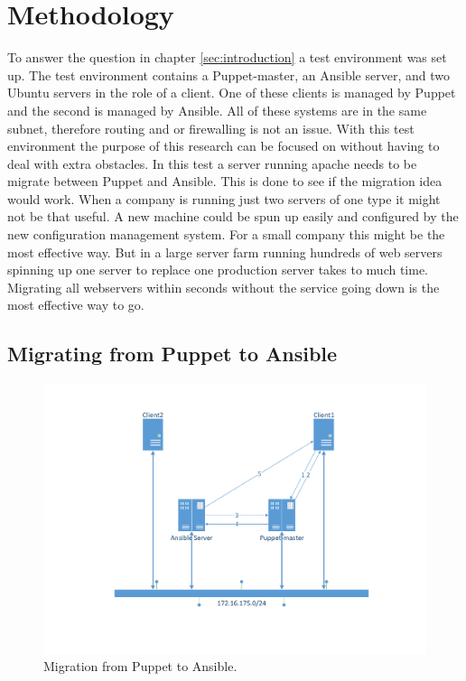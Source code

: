 \section{Methodology}\label{sec:methodology}

To answer the question in chapter \ref{sec:introduction} a test environment was set up. The test environment contains a Puppet-master, an Ansible server, and two Ubuntu servers in the role of a  client. One of these clients is managed by Puppet and the second is managed by Ansible. All of these systems are in the same subnet, therefore routing and or firewalling is not an issue. With this test environment the purpose of this research can be focused on without having to deal with extra obstacles.  
In this test a server running apache needs to be  migrate between Puppet and Ansible. This is done to see if the migration idea would work. When a company is running just two servers of one type it might not be that useful. A new machine could be spun up easily and configured by the new configuration management system. For a small company this might be the most effective way. But in a large server farm running hundreds of web servers spinning up one server to replace one production server takes to much time. Migrating all webservers within seconds without the service going down is the most effective way to go.  

\subsection{Migrating from Puppet to Ansible}\label{subsec:puppettoansible}

\begin{figure}[!hb]
        \includegraphics[scale=0.5]{img/PuppettoAnsible.pdf}
        \caption{Migration from Puppet to Ansible.}
        \label{fig:situation1}
\end{figure}


